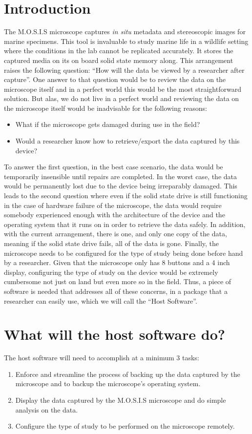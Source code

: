 \documentclass[12pt]{article}
\begin{document}

\tableofcontents
\newpage
\section{Introduction}
The M.O.S.I.S microscope captures \textit{in situ} metadata and stereoscopic images for marine specimens. This tool is invaluable to study marine life in a wildlife setting where the conditions in the lab cannot be replicated accurately. It stores the captured media on its on board solid state memory along. This arrangement raises the following question: ``How will the data be viewed by a researcher after capture''. One answer to that question would be to review the data on the microscope itself and in a perfect world this would be the most straightforward solution. But alas, we do not live in a perfect world and reviewing the data on the microscope itself would be inadvisable for the following reasons:
\begin{itemize}
\item What if the microscope gets damaged during use in the field?
\item Would a researcher know how to retrieve/export the data captured by this device?
\end{itemize}
To answer the first question, in the best case scenario, the data would be temporarily insensible until repairs are completed. In the worst case, the data would be permanently lost due to the device being irreparably damaged. This leads to the second question where even if the solid state drive is still functioning in the case of hardware failure of the microscope, the data would require somebody experienced enough with the architecture of the device and the operating system that it runs on in order to retrieve the data safely. In addition, with the current arrangement, there is one, and only one copy of the data, meaning if the solid state drive fails, all of the data is gone. Finally, the microscope needs to be configured for the type of study being done before hand by a researcher. Given that the microscope only has 8 buttons and a 4 inch display, configuring the type of study on the device would be extremely cumbersome not just on land but even more so in the field. Thus, a piece of software is needed that addresses all of these concerns, in a package that a researcher can easily use, which we will call the ``Host Software''.
\section{What will the host software do?}
The host software will need to accomplish at a minimum 3 tasks:
\begin{enumerate}
\item Enforce and streamline the process of backing up the data captured by the microscope and to backup the microscope's operating system.
\item Display the data captured by the M.O.S.I.S microscope and do simple analysis on the data.
  \item Configure the type of study to be performed on the microscope remotely.
\end{enumerate}
\end{document}
